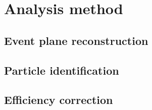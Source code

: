 
\section{Analysis method}


\subsection{Event plane reconstruction}

\blindtext

\subsection{Particle identification}

\blindtext

\subsection{Efficiency correction}

\blindtext
